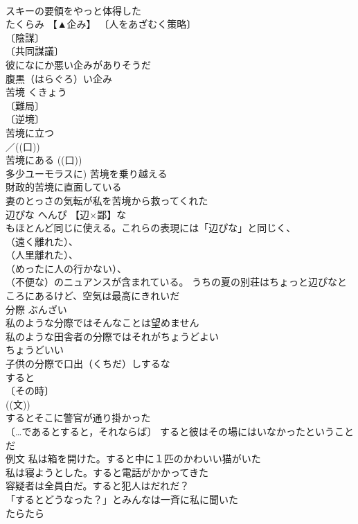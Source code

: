 \documentclass[8pt]{extreport}
\begin{document}
\begin{CJK}{UTF8}{min}
\\	スキーの要領をやっと体得した 
\\	たくらみ	【▲企み】	〔人をあざむく策略〕
\\	〔陰謀〕
\\	〔共同謀議〕
\\	彼になにか悪い企みがありそうだ 
\\	腹黒（はらぐろ）い企み 
\\	苦境	くきょう	
\\	〔難局〕
\\	〔逆境〕
\\	苦境に立つ 
\\	／((口)) 
\\	苦境にある ((口)) 
\\	多少ユーモラスに) 苦境を乗り越える 
\\	財政的苦境に直面している 
\\	妻のとっさの気転が私を苦境から救ってくれた 
\\	辺ぴな	へんぴ	【辺×鄙】な 
\\	もほとんど同じに使える。これらの表現には「辺ぴな」と同じく、
\\	（遠く離れた）、
\\	（人里離れた）、
\\	（めったに人の行かない）、
\\	（不便な）のニュアンスが含まれている。 うちの夏の別荘はちょっと辺ぴなところにあるけど、空気は最高にきれいだ 
\\	分際	ぶんざい	
\\	私のような分際ではそんなことは望めません 
\\	私のような田舎者の分際ではそれがちょうどよい
\\	ちょうどいい 
\\	子供の分際で口出（くちだ）しするな 
\\	すると		
\\	〔その時〕
\\	((文)) 
\\	するとそこに警官が通り掛かった 
\\	〔…であるとすると，それならば〕 すると彼はその場にはいなかったということだ 
\\	例文 私は箱を開けた。すると中に１匹のかわいい猫がいた 
\\	私は寝ようとした。すると電話がかかってきた 
\\	容疑者は全員白だ。すると犯人はだれだ？ 
\\	「するとどうなった？」とみんなは一斉に私に聞いた 
\\	たらたら		

\end{CJK}
\end{document}
